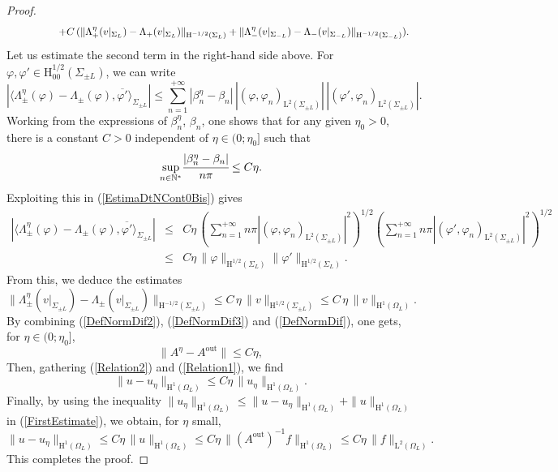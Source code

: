 \documentclass[11pt,a4paper]{report}
\newcommand{\dsp}{\displaystyle}
\newcommand{\Om}{\Omega}
\newcommand{\mrm}[1]{\mathrm{#1}}
\newcommand{\N}{\mathbb{N}}
\newcommand{\mL}{\mrm{L}}
\newcommand{\mH}{\mrm{H}}
\begin{document}
\begin{proof}
\begin{equation}
\begin{array}{l}
\hspace{1.6cm}+C\,(\|\Lambda^\eta_+(v|_{\Sigma_{L}})-\Lambda_+(v|_{\Sigma_{L}})\|_{\mH^{-1/2}(\Sigma_{L})}+\|\Lambda^\eta_-(v|_{\Sigma_{-L}})-\Lambda_-(v|_{\Sigma_{-L}})\|_{\mH^{-1/2}(\Sigma_{-L})}).
\end{array}
\end{equation} 
Let us estimate the second term in the right-hand side above. For $\varphi,\varphi'\in \mH^{1/2}_{00}(\Sigma_{\pm L})$, we can write
\begin{equation}\label{EstimaDtNCont0Bis}
|\langle \Lambda_\pm^\eta(\varphi)-\Lambda_\pm(\varphi),\overline{\varphi'}\rangle_{\Sigma_{\pm L}}| \le \dsp\sum_{n=1}^{+\infty} |\beta_n^\eta-\beta_n|\,|(\varphi,\varphi_n)_{\mL^2(\Sigma_{\pm L})}|\,|(\varphi',\varphi_n)_{\mL^2(\Sigma_{\pm L})}|. 
\end{equation}
Working from the expressions of $\beta_n^\eta$, $\beta_n$, one shows that for any given $\eta_0>0$, there is a constant $C>0$ independent of $\eta\in(0;\eta_0]$ such that 
\[
\underset{n\in\N^\ast}{\sup} \cfrac{|\beta_n^\eta-\beta_n|}{n\pi} \le C\eta.
\]
Exploiting this in (\ref{EstimaDtNCont0Bis}) gives
\[
\begin{array}{rcl}
|\langle \Lambda_\pm^\eta(\varphi)-\Lambda_\pm(\varphi),\overline{\varphi'}\rangle_{\Sigma_{\pm L}}|
&\le &  \dsp C\eta\,\left(\dsp\sum_{n=1}^{+\infty}n\pi|(\varphi,\varphi_n)_{\mL^2(\Sigma_{\pm L})}|^2\right)^{1/2} \left(\dsp\sum_{n=1}^{+\infty}n\pi|(\varphi',\varphi_n)_{\mL^2(\Sigma_{\pm L})}|^2\right)^{1/2} \\[12pt]
&\le &  \dsp C\eta\,\|\varphi\|_{\mH^{1/2}(\Sigma_{ L})}\|\varphi'\|_{\mH^{1/2}(\Sigma_{ L})}.
\end{array}
\]
From this, we deduce the estimates
\begin{equation}\label{DefNormDif3}
\|\Lambda^\eta_\pm(v|_{\Sigma_{\pm L}})-\Lambda_\pm(v|_{\Sigma_{\pm L}})\|_{\mH^{-1/2}(\Sigma_{\pm L})}\le C\,\eta\,\|v\|_{\mH^{1/2}(\Sigma_{\pm L})} \le C\,\eta\,\|v\|_{\mH^{1}(\Om_L)}.
\end{equation}
By combining (\ref{DefNormDif2}), (\ref{DefNormDif3}) and  (\ref{DefNormDif}), one gets, for $\eta\in(0;\eta_0]$,
\begin{equation}\label{Relation2}
\|A^\eta-A^{\mrm{out}}\| \le C \eta,
\end{equation}
Then, gathering (\ref{Relation2}) and (\ref{Relation1}), we find
\begin{equation}\label{FirstEstimate}
\|u-u_\eta\|_{\mH^1(\Om_L)} \le C \eta\, \|u_\eta\|_{\mH^1(\Om_L)}.
\end{equation}
Finally, by using the inequality $\|u_\eta\|_{\mH^1(\Om_L)}\le \|u-u_\eta\|_{\mH^1(\Om_L)}+\|u\|_{\mH^1(\Om_L)}  $ in (\ref{FirstEstimate}), we obtain, for $\eta$ small,
\[
\|u-u_\eta\|_{\mH^1(\Om_L)} \le C\eta\,\|u\|_{\mH^1(\Om_L)}\le C\eta\,\|(A^{\mrm{out}})^{-1}f\|_{\mH^1(\Om_L)} \le C\eta\,\|f\|_{\mL^2(\Om_L)}.
\]
This completes the proof.
\end{proof}
\end{document}
